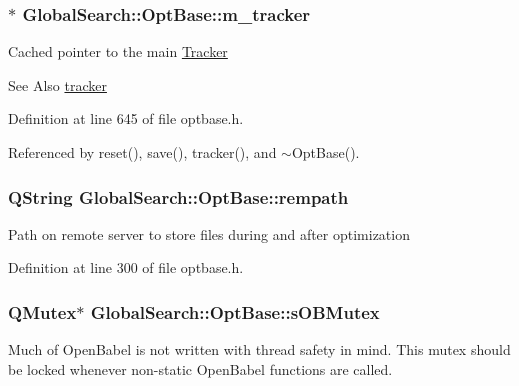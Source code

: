\hypertarget{classGlobalSearch_1_1OptBase_a60a2c6053a8ae3716854c68d0837b921}{
\subsubsection[{m\-\_\-tracker}]{$\ast$ Global\-Search\-::\-Opt\-Base\-::m\-\_\-tracker\hspace{0.3cm}{\ttfamily [protected]}}}\label{classGlobalSearch_1_1OptBase_a60a2c6053a8ae3716854c68d0837b921}
Cached pointer to the main \hyperlink{classGlobalSearch_1_1Tracker}{Tracker} \begin{DoxySeeAlso}{See Also}
\hyperlink{classGlobalSearch_1_1OptBase_a304d0d10064bd3913c8089aca76067d6}{tracker} 
\end{DoxySeeAlso}


Definition at line 645 of file optbase.\-h.



Referenced by reset(), save(), tracker(), and $\sim$\-Opt\-Base().

\hypertarget{classGlobalSearch_1_1OptBase_a777ad7fbedbb76f522e02ca73883ab7d}{
\subsubsection[{rempath}]{\setlength{\rightskip}{0pt plus 5cm}Q\-String Global\-Search\-::\-Opt\-Base\-::rempath}}\label{classGlobalSearch_1_1OptBase_a777ad7fbedbb76f522e02ca73883ab7d}
Path on remote server to store files during and after optimization 

Definition at line 300 of file optbase.\-h.

\hypertarget{classGlobalSearch_1_1OptBase_a86c1868458b6f8430dc366c009c9deb5}{
\subsubsection[{s\-O\-B\-Mutex}]{\setlength{\rightskip}{0pt plus 5cm}Q\-Mutex$\ast$ Global\-Search\-::\-Opt\-Base\-::s\-O\-B\-Mutex}}\label{classGlobalSearch_1_1OptBase_a86c1868458b6f8430dc366c009c9deb5}
Much of Open\-Babel is not written with thread safety in mind. This mutex should be locked whenever non-\/static Open\-Babel functions are called. 

